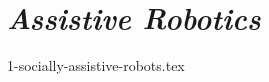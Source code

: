 \section{\emph{Assistive Robotics}}
\label{sec:sociallyassistiverobots}

\textcolor{red}{\lipsum[1-2]}

{1-socially-assistive-robots.tex}
